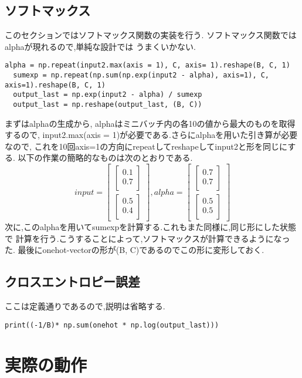 \documentclass[a4paper,11pt]{jsarticle}
\begin{document}
\subsection*{ソフトマックス}
このセクションではソフトマックス関数の実装を行う.
ソフトマックス関数ではalphaが現れるので,単純な設計では
うまくいかない.
\begin{lstlisting}[caption=SoftMax]
  alpha = np.repeat(input2.max(axis = 1), C, axis= 1).reshape(B, C, 1)
  sumexp = np.repeat(np.sum(np.exp(input2 - alpha), axis=1), C, axis=1).reshape(B, C, 1)
  output_last = np.exp(input2 - alpha) / sumexp
  output_last = np.reshape(output_last, (B, C))
\end{lstlisting}
まずはalphaの生成から, alphaはミニバッチ内の各10の値から最大のものを取得するので,
input2.max(axis = 1)が必要である.さらにalphaを用いた引き算が必要なので, 
これを10回axis=1の方向にrepeatしてreshapeしてinput2と形を同じにする.
以下の作業の簡略的なものは次のとおりである.
$$
input = \begin{bmatrix}
  \begin{bmatrix}
    0.1 \\
    0.7 \\
  \end{bmatrix} \\
  \begin{bmatrix}
    0.5 \\
    0.4 \\
  \end{bmatrix}
\end{bmatrix}, alpha = \begin{bmatrix}
  \begin{bmatrix}
    0.7 \\
    0.7 \\
  \end{bmatrix} \\
  \begin{bmatrix}
    0.5 \\
    0.5 \\
  \end{bmatrix}
\end{bmatrix}
$$
次に,このalphaを用いてsumexpを計算する.これもまた同様に,同じ形にした状態で
計算を行う.こうすることによって,ソフトマックスが計算できるようになった.
最後にonehot-vectorの形が(B, C)であるのでこの形に変形しておく.

\subsection*{クロスエントロピー誤差}
ここは定義通りであるので,説明は省略する.
\begin{lstlisting}[caption=CrossEntropy]
  print((-1/B)* np.sum(onehot * np.log(output_last)))
\end{lstlisting}

\section{実際の動作}
\end{document}
